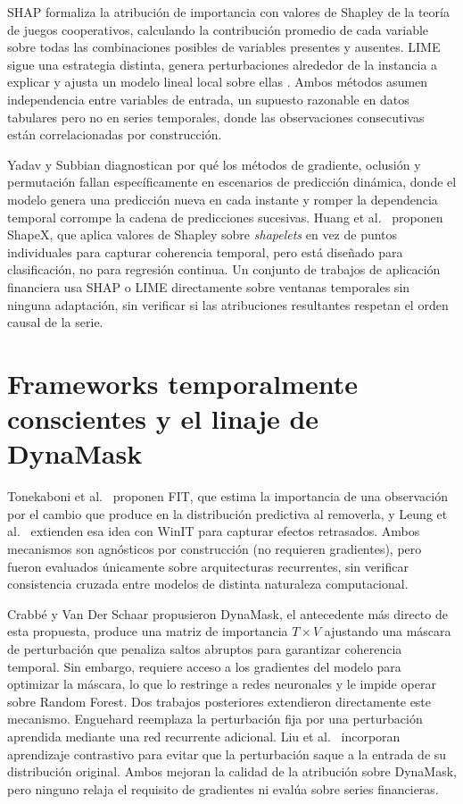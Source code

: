 SHAP formaliza la atribución de importancia con valores de Shapley de la teoría de juegos cooperativos, calculando la contribución promedio de cada variable sobre todas las combinaciones posibles de variables presentes y ausentes. LIME sigue una estrategia distinta, genera perturbaciones alrededor de la instancia a explicar y ajusta un modelo lineal local sobre ellas \cite{arsenault2025}. Ambos métodos asumen independencia entre variables de entrada, un supuesto razonable en datos tabulares pero no en series temporales, donde las observaciones consecutivas están correlacionadas por construcción.

Yadav y Subbian \cite{yadav2025} diagnostican por qué los métodos de gradiente, oclusión y permutación fallan específicamente en escenarios de predicción dinámica, donde el modelo genera una predicción nueva en cada instante y romper la dependencia temporal corrompe la cadena de predicciones sucesivas. Huang et al.\ \cite{huang2025} proponen ShapeX, que aplica valores de Shapley sobre \emph{shapelets} en vez de puntos individuales para capturar coherencia temporal, pero está diseñado para clasificación, no para regresión continua. Un conjunto de trabajos de aplicación financiera \cite{gupta2025, sathyampeth2025, manikrao2026, jagannathan2025, kumar2024, singh2025, muhammad2024} usa SHAP o LIME directamente sobre ventanas temporales sin ninguna adaptación, sin verificar si las atribuciones resultantes respetan el orden causal de la serie.

\section{Frameworks temporalmente conscientes y el linaje de DynaMask}

Tonekaboni et al.\ \cite{tonekaboni2020} proponen FIT, que estima la importancia de una observación por el cambio que produce en la distribución predictiva al removerla, y Leung et al.\ \cite{leung2023winit} extienden esa idea con WinIT para capturar efectos retrasados. Ambos mecanismos son agnósticos por construcción (no requieren gradientes), pero fueron evaluados únicamente sobre arquitecturas recurrentes, sin verificar consistencia cruzada entre modelos de distinta naturaleza computacional.

Crabbé y Van Der Schaar \cite{crabbe2021} propusieron DynaMask, el antecedente más directo de esta propuesta, produce una matriz de importancia $T \times V$ ajustando una máscara de perturbación que penaliza saltos abruptos para garantizar coherencia temporal. Sin embargo, requiere acceso a los gradientes del modelo para optimizar la máscara, lo que lo restringe a redes neuronales y le impide operar sobre Random Forest. Dos trabajos posteriores extendieron directamente este mecanismo. Enguehard \cite{enguehard2023} reemplaza la perturbación fija por una perturbación aprendida mediante una red recurrente adicional. Liu et al.\ \cite{liu2024contralsp} incorporan aprendizaje contrastivo para evitar que la perturbación saque a la entrada de su distribución original. Ambos mejoran la calidad de la atribución sobre DynaMask, pero ninguno relaja el requisito de gradientes ni evalúa sobre series financieras.

